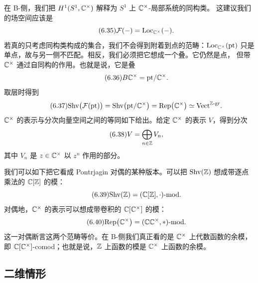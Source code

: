 在 B-侧，我们把 $H^1(S^1,\mathbb{C}^{\times})$ 解释为 $S^1$ 上 $\mathbb{C}^{\times}$-局部系统的同构类。
这建议我们的场空间应该是
\begin{equation}\tag{6.35}\label{eq:6.35}
\mathcal{F}(-)=\mathrm{Loc}_{\mathbb{C}^{\times}}(-).
\end{equation}
若真的只考虑同构类构成的集合，我们不会得到附着到点的范畴：$\mathrm{Loc}_{\mathbb{C}^{\times}}(\mathrm{pt})$
只是单点，故与另一侧不匹配。相反，我们必须把它想成一个叠。它仍然是点，
但带 $\mathbb{C}^{\times}$ 通过自同构的作用。也就是说，它是叠
\begin{equation}\tag{6.36}\label{eq:6.36}
B\mathbb{C}^{\times}=\mathrm{pt}/\mathbb{C}^{\times}.
\end{equation}
取层时得到
\begin{equation}\tag{6.37}\label{eq:6.37}
\mathrm{Shv}\bigl(\mathcal{F}(\mathrm{pt})\bigr)=\mathrm{Shv}\bigl(\mathrm{pt}/\mathbb{C}^{\times}\bigr)
=\mathrm{Rep}\bigl(\mathbb{C}^{\times}\bigr)\simeq\mathrm{Vect}^{\mathbb{Z}\text{-gr}}.
\end{equation}
$\mathbb{C}^{\times}$ 的表示与分次向量空间之间的等同如下给出。给定 $\mathbb{C}^{\times}$ 的表示 $V$，得到分次
\begin{equation}\tag{6.38}\label{eq:6.38}
V=\bigoplus_{n\in\mathbb{Z}}V_n,
\end{equation}
其中 $V_n$ 是 $z\in\mathbb{C}^{\times}$ 以 $z^n$ 作用的部分。


我们可以如下把它看成 Pontrjagin 对偶的某种版本。可以把 $\mathrm{Shv}(\mathbb{Z})$ 想成带逐点乘法的
$\mathbb{C}[\mathbb{Z}]$ 的模：
\begin{equation}\tag{6.39}\label{eq:6.39}
\mathrm{Shv}(\mathbb{Z})=(\mathbb{C}[\mathbb{Z}],\cdot)\text{-mod}.
\end{equation}
对偶地，$\mathbb{C}^{\times}$ 的表示可以想成带卷积的 $\mathbb{C}[\mathbb{C}^{\times}]$ 的模：
\begin{equation}\tag{6.40}\label{eq:6.40}
\mathrm{Rep}\bigl(\mathbb{C}^{\times}\bigr)=(\mathbb{C}\mathbb{C}^{\times},*)\text{-mod}.
\end{equation}
这一对偶断言这两个范畴等价。在 B-侧我们真正看的是 $\mathbb{C}^{\times}$ 上代数函数的余模，
即 $\mathbb{C}[\mathbb{C}^{\times}]$-comod；也就是说，$\mathbb{Z}$ 上函数的模是 $\mathbb{C}^{\times}$ 上函数的余模。

\subsection{二维情形}

